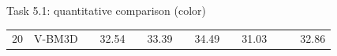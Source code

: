 \documentclass[mathserif, 8pt]{beamer}
\newcommand{\bsic}[1]{\textcolor{gray}{#1}}
\newcommand{\Bsic}[1]{\textcolor{gray}{\textbf{#1}}}
\newcommand{\Best}[1]{\textbf{\textcolor{MyOrangeBrighter}{#1}}}
\begin{document}
\begin{frame}{Task 5.1: quantitative comparison (color)}
\begin{center}
{\begin{tabular}{ c | l |c c | c c | c c | c c | c c | c}
%                                                                                                                                                                                                                          
			\multirow{1}{*}{$20$}
			                      & V-BM3D               & \bsic{     } &       32.54  & \bsic{     } &       33.39  & \bsic{     } &       34.49  & \bsic{     } &       31.03  & \bsic{     } &              &       32.86  \\

\end{tabular}}
\end{center}
\end{frame}
\end{document}
